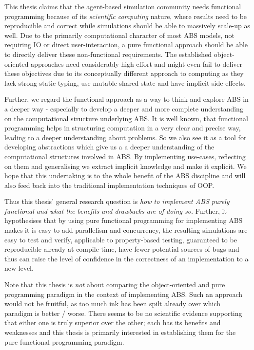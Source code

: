 \medskip

This thesis claims that the agent-based simulation community needs functional programming because of its \textit{scientific computing} nature, where results need to be reproducible and correct while simulations should be able to massively scale-up as well. Due to the primarily computational character of most ABS models, not requiring IO or direct user-interaction, a pure functional approach should be able to directly deliver these non-functional requirements. The established object-oriented approaches need considerably high effort and might even fail to deliver these objectives due to its conceptually different approach to computing as they lack strong static typing, use mutable shared state and have implicit side-effects. 

Further, we regard the functional approach as a way to think and explore ABS in a deeper way - especially to develop a deeper and more complete understanding on the computational structure underlying ABS. It is well known, that functional programming helps in structuring computation in a very clear and precise way, leading to a deeper understanding about problems. So we also see it as a tool for developing abstractions which give us a a deeper understanding of the computational structures involved in ABS. By implementing use-cases, reflecting on them and generalising we extract implicit knowledge and make it explicit. We hope that this undertaking is to the whole benefit of the ABS discipline and will also feed back into the traditional implementation techniques of OOP.

Thus this thesis' general research question is \textit{how to implement ABS purely functional and what the benefits and drawbacks are of doing so.} Further, it hypothesises that by using pure functional programming for implementing ABS makes it is easy to add parallelism and concurrency, the resulting simulations are easy to test and verify, applicable to property-based testing, guaranteed to be reproducible already at compile-time, have fewer potential sources of bugs and thus can raise the level of confidence in the correctness of an implementation to a new level.

\medskip

Note that this thesis is \textit{not} about comparing the object-oriented and pure programming paradigm in the context of implementing ABS. Such an approach would not be fruitful, as too much ink has been spilt already over which paradigm is better / worse. There seems to be no scientific evidence supporting that either one is truly superior over the other; each has its benefits and weaknesses and this thesis is primarily interested in establishing them for the pure functional programming paradigm.

